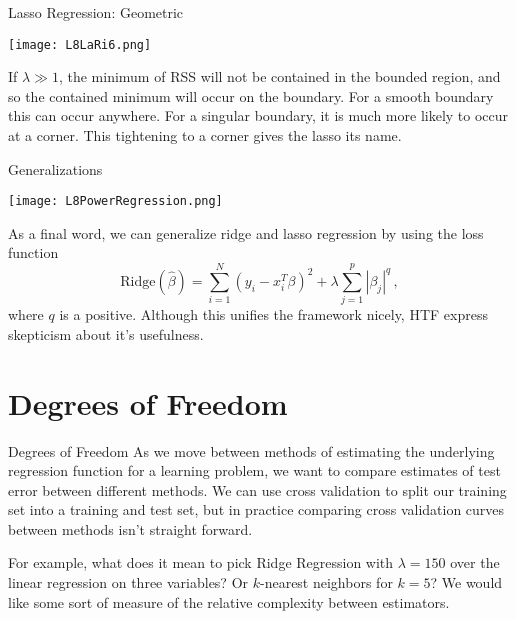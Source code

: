 \documentclass[10pt, table, dvipsnames,xcdraw,handout]{beamer}
\begin{document}
\begin{frame}[fragile]{Lasso Regression: Geometric} 
  \begin{minipage}[t][0.5\textheight][t]{\textwidth}
	\centering \texttt{[image: L8LaRi6.png]} 
  \end{minipage}
  \vfill
\begin{minipage}[t][0.5\textheight][t]{\textwidth}
If $\lambda\gg 1$, the minimum of RSS will not be contained in the bounded region, and so the contained minimum will occur on the boundary. For a smooth boundary this can occur anywhere. For a singular boundary, it is much more likely to occur at a corner. This tightening to a corner gives the lasso its name.  
\end{minipage}
\end{frame}




\begin{frame}[fragile]{Generalizations} 
  \begin{minipage}[t][0.3\textheight][t]{\textwidth}
	\centering \texttt{[image: L8PowerRegression.png]} 
  \end{minipage}
  \vfill
\begin{minipage}[t][0.7\textheight][t]{\textwidth}
As a final word, we can generalize ridge and lasso regression by using the loss function
$$
\text{Ridge}(\hat \beta) = \sum_{i=1}^N(y_i - x_i^T\beta)^2 +\lambda \sum_{j=1}^p|\beta_j|^q\,,
$$
where $q$ is a positive. \pause Although this unifies the framework nicely, HTF express skepticism about it's usefulness. 
\end{minipage}
\end{frame}




\section{Degrees of Freedom}

\begin{frame}[fragile]{Degrees of Freedom} 
As we move between methods of estimating the underlying regression function for a learning problem, we want to compare estimates of test error between different methods. We can use cross validation to split our training set into a training and test set, but in practice comparing cross validation curves between methods isn't straight forward. \pause

For example, what does it mean to pick  Ridge Regression with $\lambda = 150$ over the linear regression on three variables? Or $k$-nearest neighbors for $k=5$? We would like some sort of measure of the relative complexity between estimators. 

\end{frame}
\end{document}
